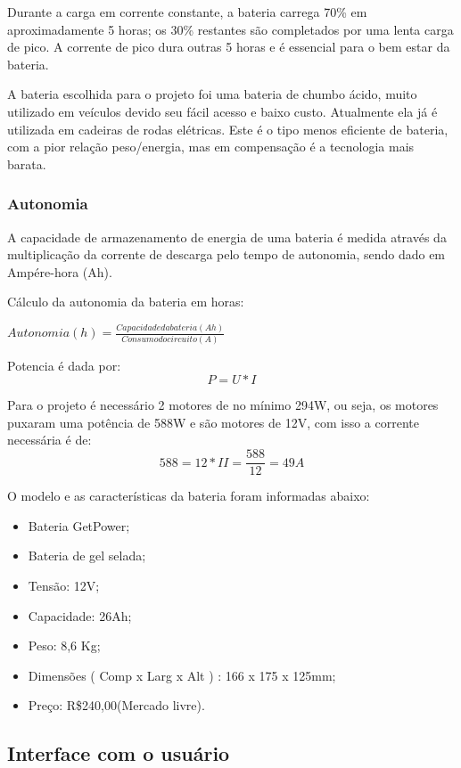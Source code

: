 Durante a carga em corrente constante, a bateria carrega 70\% em aproximadamente 5 horas; os 30\% restantes são completados por uma lenta carga de pico. A corrente de pico dura outras 5 horas e é essencial para o bem estar da bateria.

A bateria escolhida para o projeto foi uma bateria de chumbo ácido, muito utilizado em veículos devido seu fácil acesso e baixo custo. Atualmente ela já é utilizada em cadeiras de rodas elétricas. Este é o tipo menos eficiente de bateria, com a pior relação peso/energia, mas em compensação é a tecnologia mais barata.

\subsubsection{Autonomia}
A capacidade de armazenamento de energia de uma bateria é medida através da multiplicação da corrente de descarga pelo tempo de autonomia, sendo dado em Ampére-hora (Ah).

Cálculo da autonomia da bateria em horas:

$Autonomia(h) = \frac{Capacidade da bateria(Ah)}{Consumo do circuito(A)}$

Potencia é dada por:
\begin{equation}
 P=U*I
\end{equation}

Para o projeto é necessário 2 motores de no mínimo 294W, ou seja, os motores puxaram uma potência de 588W e são motores de 12V, com isso a corrente necessária é de:
\begin{equation}
588 = 12 * I
I = \frac{588}{12} = 49A
\end{equation}

O modelo e as características da bateria foram informadas abaixo:

\begin{itemize}
 \item Bateria GetPower;
 \item Bateria de gel selada;
 \item Tensão: 12V;
 \item Capacidade: 26Ah;
 \item Peso: 8,6 Kg;
 \item Dimensões ( Comp x Larg x Alt ) : 166 x 175 x 125mm;
 \item Preço: R\$240,00(Mercado livre).
\end{itemize}

\subsection{Interface com o usuário}

